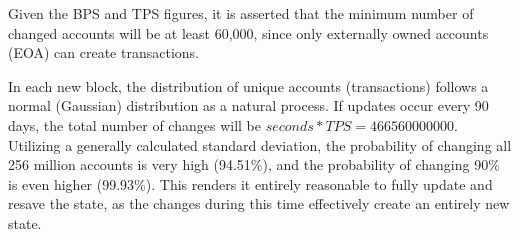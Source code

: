 Given the BPS and TPS figures,
 it is asserted that the minimum number of changed accounts will be at least 60,000, 
 since only externally owned accounts (EOA) can create transactions.

In each new block, the distribution of unique accounts (transactions) follows a normal 
(Gaussian) distribution as a natural process. If updates occur every 90 days, the total 
number of changes will be $seconds * TPS = 466560000000$. Utilizing a generally calculated 
standard deviation, the probability of changing all 256 million accounts is very high (94.51\%), 
and the probability of changing 90\% is even higher (99.93\%). This renders it entirely 
reasonable to fully update and resave the state, as the changes during this time effectively 
create an entirely new state.